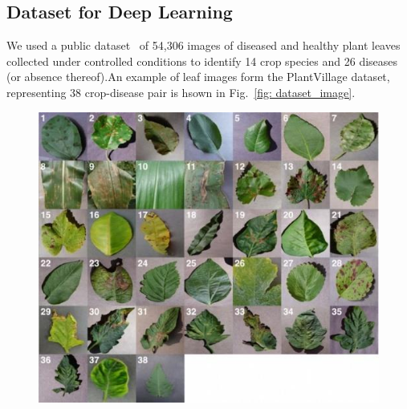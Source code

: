 \subsection{Dataset for Deep Learning}

We used a public dataset~\cite{PlantVil94:online} of 54,306 images of diseased and healthy plant leaves collected under controlled conditions to identify 14 crop species and 26 diseases (or absence thereof).An example of leaf images form the PlantVillage dataset, representing 38 crop-disease pair is hsown in Fig.~\ref{fig: dataset_image}.

\begin{figure}[!h]
	\includegraphics[width=1\linewidth]{fin_img_1}
	\centering

\end{figure}
